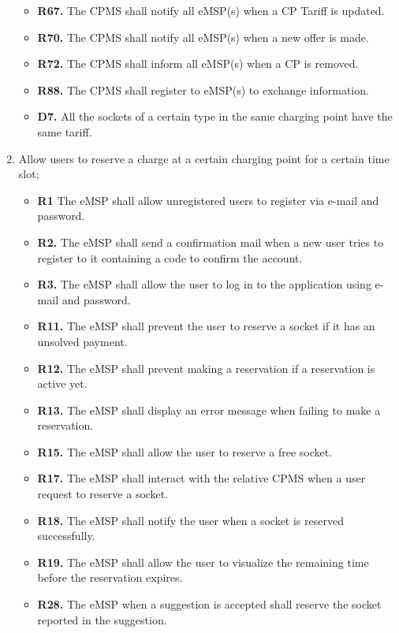 \documentclass{Configuration_Files/PoliMi3i_thesis}
\begin{document}
\begin{enumerate}[label=\textbf{G\arabic*}]
\begin{itemize}
            \item \textbf{R67.} The CPMS  shall notify all eMSP(s) when a CP Tariff is updated.
            \item \textbf{R70.} The CPMS  shall notify all eMSP(s) when a new offer is made.
            \item \textbf{R72.} The CPMS shall inform all eMSP(s) when a CP is removed.
            \item \textbf{R88.} The CPMS shall register to eMSP(s) to exchange information.
            \item \textbf{D7.} All the sockets of a certain type in the same charging point have the same tariff.
        \end{itemize}
    
    \item Allow users to reserve a charge at a certain charging point for a certain time slot;
        \begin{itemize}
            \item \textbf{R1} The eMSP shall allow unregistered users to register via e-mail and password.
            \item \textbf{R2.} The eMSP shall send a confirmation mail when a new user tries to register to it containing a code to confirm the account.
            \item \textbf{R3.} The eMSP shall allow the user to log in to the application using e-mail and password.
            \item \textbf{R11.} The eMSP shall prevent the user to reserve a socket if it has an unsolved payment.
            \item \textbf{R12.} The eMSP shall prevent making a reservation if a reservation is active yet.
            \item \textbf{R13.} The eMSP shall display an error message when failing to make a reservation.
            \item \textbf{R15.} The eMSP shall allow the user to reserve a free socket.
            \item \textbf{R17.} The eMSP shall interact with the relative CPMS when a user request to reserve a socket.
            \item \textbf{R18.} The eMSP shall notify the user when a socket is reserved successfully.
            \item \textbf{R19.} The eMSP shall allow the user to visualize the remaining time before the reservation expires.
            \item \textbf{R28.} The eMSP when a suggestion is accepted shall reserve the socket reported in the suggestion.

\end{itemize}
\end{enumerate}
\end{document}
